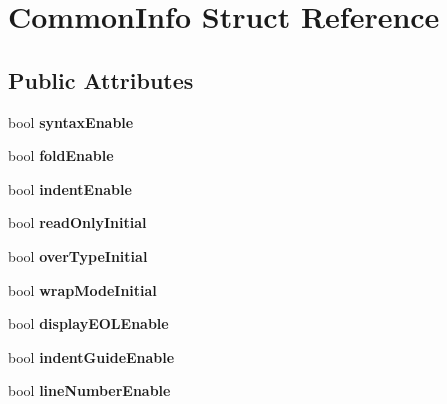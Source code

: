 \hypertarget{struct_common_info}{\section{Common\+Info Struct Reference}
\label{struct_common_info}
}
\subsection*{Public Attributes}
\begin{DoxyCompactItemize}
\item 
\hypertarget{struct_common_info_a99a413cd9da7d4e1049eb0bce98065d2}{bool {\bfseries syntax\+Enable}}\label{struct_common_info_a99a413cd9da7d4e1049eb0bce98065d2}

\item 
\hypertarget{struct_common_info_a1bcd80ac2c2134e3fe43f7d82ac1f850}{bool {\bfseries fold\+Enable}}\label{struct_common_info_a1bcd80ac2c2134e3fe43f7d82ac1f850}

\item 
\hypertarget{struct_common_info_a7104659d4f2ced727fe5bd5a3adca7c0}{bool {\bfseries indent\+Enable}}\label{struct_common_info_a7104659d4f2ced727fe5bd5a3adca7c0}

\item 
\hypertarget{struct_common_info_a8922f6c9eb080084a5370e0ea7b5b775}{bool {\bfseries read\+Only\+Initial}}\label{struct_common_info_a8922f6c9eb080084a5370e0ea7b5b775}

\item 
\hypertarget{struct_common_info_a26e98e62bfc97ec7f394841c1253c109}{bool {\bfseries over\+Type\+Initial}}\label{struct_common_info_a26e98e62bfc97ec7f394841c1253c109}

\item 
\hypertarget{struct_common_info_aff7a584d1c2884bfd082fd9ea0269ba7}{bool {\bfseries wrap\+Mode\+Initial}}\label{struct_common_info_aff7a584d1c2884bfd082fd9ea0269ba7}

\item 
\hypertarget{struct_common_info_abb34cd44d96ba84f2019e46a8d651c6d}{bool {\bfseries display\+E\+O\+L\+Enable}}\label{struct_common_info_abb34cd44d96ba84f2019e46a8d651c6d}

\item 
\hypertarget{struct_common_info_a248215d39f176a1d1d8a6e1fe213d960}{bool {\bfseries indent\+Guide\+Enable}}\label{struct_common_info_a248215d39f176a1d1d8a6e1fe213d960}

\item 
\hypertarget{struct_common_info_ad17f055b76e26532fe03af219ee14c13}{bool {\bfseries line\+Number\+Enable}}\label{struct_common_info_ad17f055b76e26532fe03af219ee14c13}


\end{DoxyCompactItemize}
